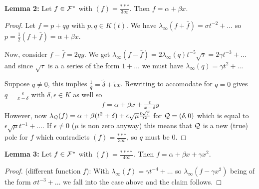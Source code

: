 \documentclass[english,11pt,a4paper]{article}
\begin{document}
\textbf{Lemma 2:} Let $f \in \mathcal{F}^*$ with $(f)=\frac{***}{3\infty}$. Then $f = \alpha + \beta x$.
\begin{proof}
	Let $f=p+qy$ with $p, q \in K(t)$. We have $\lambda_\infty (f + \bar f) = \sigma t^{-2} + \dots$ so $p = \frac{1}{2} (f+\bar f) = \alpha + \beta x$.

	Now, consider $f-\bar f = 2qy$. We get $\lambda_\infty (f-\bar f) = 2 \lambda_\infty (q) t^{-5} \sqrt \tau = 2 \gamma t^{-3}+\dots$ and since $\sqrt \tau$ is a a series of the form $1 + \dots$ we must have $\lambda_\infty (q) = \gamma t^2 + \dots$

	Suppose $q \neq 0$, this implies $\frac{1}{q} = \tilde \delta + \tilde \epsilon x$. Rewriting to accomodate for $q=0$ gives $q=\frac{\epsilon}{x-\delta}$ with $\delta, \epsilon \in K$ as well so
	\begin{align*}
	  f=\alpha + \beta x +\frac{\epsilon}{x-\delta}y
	\end{align*}
	However, now $\lambda_{\mathcal{Q}} (f) = \alpha + \beta (t^2+\delta) + \epsilon \sqrt \mu \frac{t \sqrt \tau}{t^2}$ for $\mathcal{Q} = (\delta,0)$ which is equal to $\epsilon \sqrt \mu t^{-1} + \dots$. If $\epsilon \neq 0$ ($\mu$ is non zero anyway) this means that $\mathcal{Q}$ is a new (true) pole for $f$ which contradicts $(f)=\frac{***}{3\infty}$, so $q$ must be 0.
\end{proof}

\textbf{Lemma 3:} Let $f \in \mathcal{F}^*$ with $(f)=\frac{****}{4\infty}$. Then $f = \alpha + \beta x + \gamma x^2$.

\begin{proof}
	(different function $f$): With $\lambda_\infty(f) = \gamma t^{-4}+\dots$ so $\lambda_\infty(f-\gamma x^2)$ being of the form $\sigma t^{-3}+\dots$ we fall into the case above and the claim follows.
\end{proof}
\vspace{-8mm}
\fline
\end{document}
